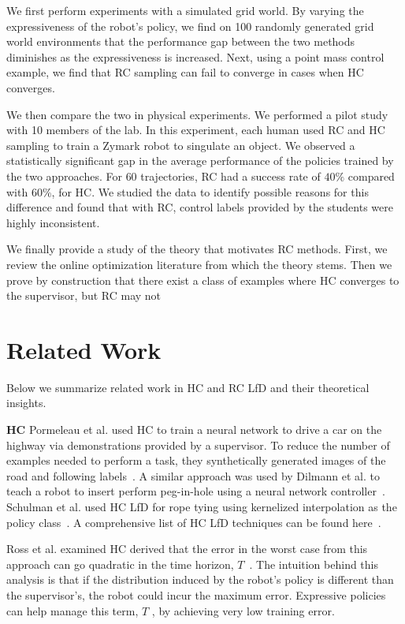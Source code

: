 \documentclass[10pt, conference]{ieeeconf}      %
\newcommand{\ns}{HC }
\begin{document}
We first perform experiments with a simulated grid world. By varying the expressiveness of the robot's policy, we find on 100 randomly generated grid world environments that the performance gap between the two methods diminishes as the expressiveness is increased. Next, using a point mass control example, we find that RC sampling can fail to converge in cases when HC converges.

We then compare the two in physical experiments. We performed a pilot study with 10 members of the lab.
In this experiment, each human used RC and HC sampling to train a Zymark robot to singulate an object. We observed a statistically significant gap in the average performance of the policies trained by the two approaches. For $60$  trajectories, RC had a success rate of $40\%$ compared with  $60\%$, for HC. We studied the data to identify possible reasons for this difference and found that with RC, control labels provided by the students were highly inconsistent.

We finally provide a  study of the  theory that motivates RC methods.  First, we review the online optimization literature from which the theory stems. Then we prove by construction that there exist a class of examples where HC converges to the supervisor, but RC may not



\section{Related Work}
Below we summarize related work in HC and RC LfD and their theoretical insights. 

\noindent \textbf {\ns}  Pormeleau et al. used \ns to train a neural network to drive a car on the highway via demonstrations provided by a supervisor. To reduce the number of examples needed to perform a task, they synthetically generated images of the road and following labels~\cite{pomerleau1989alvinn}.  A similar approach was used by Dilmann et al. to teach a robot to insert perform peg-in-hole using a neural network controller~\cite{dillmann1995acquisition}. Schulman et al. used HC LfD for rope tying using kernelized interpolation as the policy class~\cite{schulman2016learning}.  A comprehensive list of HC LfD techniques can be found here~\cite{argall2009survey}. 

Ross et al. examined \ns  derived that the error in the worst case from this approach can go quadratic in the time horizon, $T$~\cite{ross2010efficient}. The intuition behind this analysis is that if the distribution induced by the robot's policy is different than the supervisor's, the robot could incur the maximum error. Expressive policies can help manage this term, $T$ , by achieving very low training error. 
\end{document}
